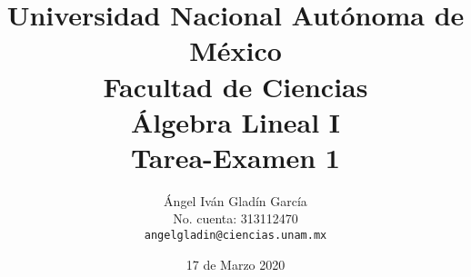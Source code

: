 \documentclass[11pt,letterpaper]{article}
\begin{document}
\title{
        Universidad Nacional Autónoma de México\\
        Facultad de Ciencias\\
        Álgebra Lineal I\\
    \vspace{.5cm}
    \large
        \textbf{Tarea-Examen 1}
}
\author{
    Ángel Iván Gladín García\\
    No. cuenta: 313112470\\
    \texttt{angelgladin@ciencias.unam.mx}
}
\date{17 de Marzo 2020}
\maketitle

\newtheorem{theorem}{Teorema}
\newtheorem{example}{Ejemplo}
\newtheorem{corollary}{Corolario}
\newtheorem{lemma}{Lemma}
\newtheorem{definition}{Definicion}
\newtheorem{prop}{Proposicion}
\end{document}
